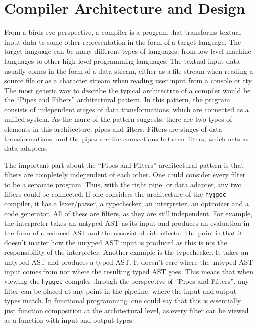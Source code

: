 \section{Compiler Architecture and Design}

From a birds eye perspective, a compiler is a program that transforms textual input data to some other representation in the form of a target language.
The target language can be many different types of languages: from low-level machine languages to other high-level programming languages.
The textual input data usually comes in the form of a data stream, either as a file stream when reading a source file or as a character stream when
reading user input from a console or tty. The most generic way to describe the typical architecture of a compiler would be the ``Pipes and Filters''
architectural pattern\cite{cunningham}. In this pattern, the program consists of independent stages of data transformations, which are connected as a unified system.
As the name of the pattern suggests, there are two types of elements in this architecture: pipes and filters. Filters are stages of data transformations,
and the pipes are the connections between filters, which acts as data adapters.

The important part about the ``Pipes and Filters'' architectural pattern is that filters are completely independent of each other. One could consider
every filter to be a separate program. Thus, with the right pipe, or data adapter, any two filters could be connected. If one considers the architecture
of the \texttt{hyggec} compiler, it has a lexer/parser, a typechecker, an interpreter, an optimizer and a code generator. All of these are filters,
as they are still independent. For example, the interpreter takes an untyped AST as its input and produces an evaluation in the form of a reduced AST
and the associated side-effects. The point is that it doesn't matter how the untyped AST input is produced as this is not the responsibility of the
interpreter. Another example is the typechecker. It takes an untyped AST and produces a typed AST. It doesn't care where the untyped AST input comes
from nor where the resulting typed AST goes. This means that when viewing the \texttt{hyggec} compiler through the perspective of ``Pipes and Filters'',
any filter can be placed at any point in the pipeline, where the input and output types match. In functional programming, one could say that this is
essentially just function composition at the architectural level, as every filter can be viewed as a function with input and output types.

